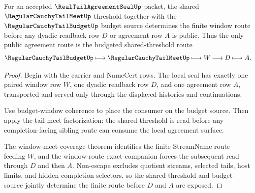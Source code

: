 \begin{theorem}
\label{thm:real-tail-agreement-seal-shared-threshold-budget-exactness}
For an accepted $\RealTailAgreementSealUp$ packet, the shared $\RegularCauchyTailMeetUp$ threshold together with the $\RegularCauchyTailBudgetUp$ budget source determines the finite window route before any dyadic readback row $D$ or agreement row $A$ is public. Thus the only public agreement route is the budgeted shared-threshold route
$$
\RegularCauchyTailBudgetUp \longmapsto \RegularCauchyTailMeetUp \longmapsto W \longmapsto D \longmapsto A.
$$
\end{theorem}
\begin{proof}
Begin with the carrier and NameCert rows. The local seal has exactly one paired window row $W$, one dyadic readback row $D$, and one agreement row $A$, transported and served only through the displayed histories and continuations.

Use budget-window coherence to place the consumer on the budget source. Then apply the tail-meet factorization: the shared threshold is read before any completion-facing sibling route can consume the local agreement surface.

The window-meet coverage theorem identifies the finite StreamName route feeding $W$, and the window-route exact companion forces the subsequent read through $D$ and then $A$. Non-escape excludes quotient streams, selected tails, host limits, and hidden completion selectors, so the shared threshold and budget source jointly determine the finite route before $D$ and $A$ are exposed.
\end{proof}


